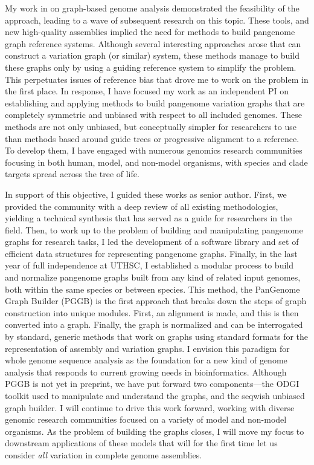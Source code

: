\documentclass{nihbiosketch}
\begin{document}
\begin{enumerate}
  My work in on graph-based genome analysis demonstrated the feasibility of the approach, leading to a wave of subsequent research on this topic.
  These tools, and new high-quality assemblies implied the need for methods to build pangenome graph reference systems.
  Although several interesting approaches arose that can construct a variation graph (or similar) system, these methods manage to build these graphs only by using a guiding reference system to simplify the problem.
  This perpetuates issues of reference bias that drove me to work on the problem in the first place.
  In response, I have focused my work as an independent PI on establishing and applying methods to build pangenome variation graphs that are completely symmetric and unbiased with respect to all included genomes.
  These methods are not only unbiased, but conceptually simpler for researchers to use than methods based around guide trees or progressive alignment to a reference.
  To develop them, I have engaged with numerous genomics research communities focusing in both human, model, and non-model organisms, with species and clade targets spread across the tree of life.

  In support of this objective, I guided these works as senior author.
  First, we provided the community with a deep review of all existing methodologies, yielding a technical synthesis that has served as a guide for researchers in the field.
  Then, to work up to the problem of building and manipulating pangenome graphs for research tasks, I led the development of a software library and set of efficient data structures for representing pangenome graphs.
  Finally, in the last year of full independence at UTHSC, I established a modular process to build and normalize pangenome graphs built from any kind of related input genomes, both within the same species or between species.
  This method, the PanGenome Graph Builder (PGGB) is the first approach that breaks down the steps of graph construction into unique modules.
  First, an alignment is made, and this is then converted into a graph.
  Finally, the graph is normalized and can be interrogated by standard, generic methods that work on graphs using standard formats for the representation of assembly and variation graphs.
  I envision this paradigm for whole genome sequence analysis as the foundation for a new kind of genome analysis that responds to current growing needs in bioinformatics.
  Although PGGB is not yet in preprint, we have put forward two components---the ODGI toolkit used to manipulate and understand the graphs, and the seqwish unbiased graph builder.
  I will continue to drive this work forward, working with diverse genomic research communities focused on a variety of model and non-model organisms.
  As the problem of building the graphs closes, I will move my focus to downstream applications of these models that will for the first time let us consider \textit{all} variation in complete genome assemblies.


\end{enumerate}
\end{document}
